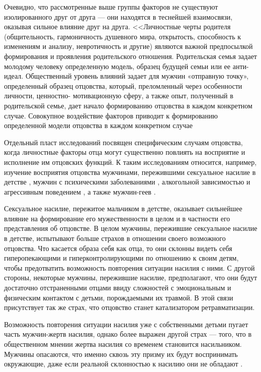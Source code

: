 \documentclass{../../common/thesisbyxetex}
\begin{document}
Очевидно, что рассмотренные выше группы факторов не существуют изолированного друг от друга --- они
находятся в теснейшей взаимосвязи, оказывая сильное влияние друг на друга. <<Личностные черты
родителя
(общительность, гармоничность душевного мира, открытость, способность к
изменениям и анализу, невротичность и другие) являются важной предпосылкой
формирования и проявления родительского отношения. Родительская семья задает
молодому человеку определенную модель, образец будущей семьи или ее анти-идеал.
Общественный уровень влияний задает для мужчин «отправную точку», определенный
образец отцовства, который, преломленный через особенности личности, ценностно-
мотивационную сферу, а также опыт, полученный в родительской семье, дает начало
формированию отцовства в каждом конкретном случае. Совокупное воздействие
факторов приводит к формированию определенной модели отцовства в каждом
конкретном случае \cite[122]{har}

Отдельный пласт исследований посвящен специфическим случаям отцовства, когда личностные факторы
отца могут существенно повлиять на восприятие и исполнение им отцовских функций. К таким
исследованиям относится, например, изучение восприятия отцовства мужчинами, пережившими сексуальное
насилие в детстве \cite{sex}, мужчин с психическими заболеваниями \cite{gbi}, алкогольной
зависимостью и агрессивным поведением \cite{alc}, а также мужчин-геев \cite{gay}.

Сексуальное насилие, пережитое мальчиком в детстве, оказывает сильнейшее влияние на формирование
его мужественности в целом и в частности его представления об отцовстве. В целом мужчины,
пережившие сексуальное насилие в детстве, испытывают больше страхов в отношении своего возможного
отцовства.  Что касается образа себя как отца, то они склонны видеть себя гиперопекающими  и
гиперконтролирующими по отношению к своим детям, чтобы предотватить возможность повторения
ситуации насилия с ними. С другой стороны, некоторые мужчины, пережившие насилие, предполагают,
что они будут достаточно отстраненными отцами ввиду сложностей с эмоциональным и физическим
контактом с детьми, порождаемыми их травмой. В этой связи присутствует так же страх, что отцовство
станет катализатором ретравматизации.

Возможность повторения ситуации насилия уже с собственными детьми пугает часть мужчин-жертв
насилия, однако более выражен другой страх --- того, что в общественном мнении жертва насилия
со временем становится насильником. Мужчины опасаются, что именно сквозь эту призму их будут
воспринимать окружающие, даже если реальной склонностью к насилию они не обладают \cite{sex}.
\end{document}

